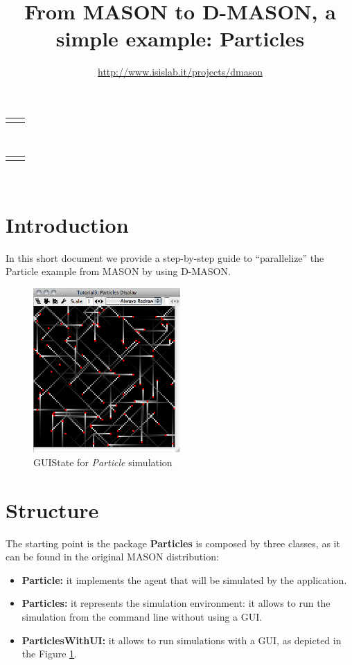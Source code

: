 \documentclass[12pt]{article}
\newcommand{\leftright}[2]{\begin{tabularx}{\textwidth}{X>{\raggedleft}X}#1%
& #2\\\end{tabularx}\\[-0.5cm]}
\begin{document}
\title{From MASON to D-MASON, a simple example: Particles}
\author{\url{http://www.isislab.it/projects/dmason}}
\maketitle
\leftright{}{}
\leftright{}{}

\section{Introduction}
In this short document we provide a step-by-step guide to ``parallelize'' the Particle example from MASON by using D-MASON.
\begin{figure}[ht]
	\centering
		\includegraphics[width=0.5\textwidth, bb=0 0 470 520]{particles.png}	
		\caption{GUIState for \textit{Particle} simulation}
	\label{fig:p01}
\end{figure}
\section{Structure}
The starting point is the package \textbf{Particles} is composed by three classes, as it can be found in the original MASON distribution:

\begin{itemize}
	\item \textbf{Particle:} it implements the agent that will be simulated by the application.
	\item \textbf{Particles:} it represents the simulation environment: it allows to run the simulation from the command line without using a GUI.
	\item \textbf{ParticlesWithUI:} it allows to run simulations with a GUI, as depicted in the Figure \ref{fig:p01}.
\end{itemize}
\end{document}
